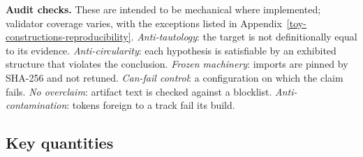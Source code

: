 \textbf{Audit checks.} These are intended to be mechanical where implemented; validator coverage varies, with the
exceptions listed in Appendix~\ref{toy-constructions-reproducibility}. \emph{Anti-tautology}: the target is not
definitionally equal to its evidence. \emph{Anti-circularity}: each hypothesis is satisfiable by an exhibited structure
that violates the conclusion. \emph{Frozen machinery}: imports are pinned by SHA-256 and not retuned.
\emph{Can-fail control}: a configuration on which the claim fails. \emph{No overclaim}: artifact text is checked
against a blocklist. \emph{Anti-contamination}: tokens foreign to a track fail its build.

\subsection{Key quantities}\label{the-key-derived-quantities-of-the-body}

